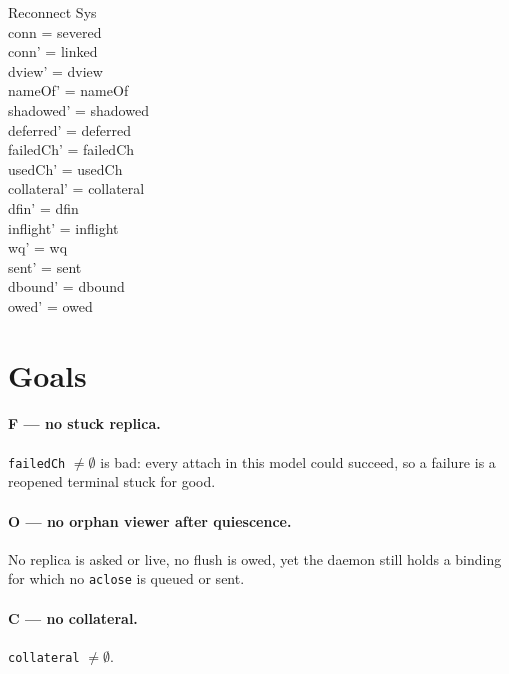 \documentclass[a4paper,10pt,fleqn]{article}
\begin{document}
\begin{schema}{Reconnect}
  \Delta Sys \\
\where
  conn = severed \\
  conn' = linked \\
  dview' = dview \\
  nameOf' = nameOf \\
  shadowed' = shadowed \\
  deferred' = deferred \\
  failedCh' = failedCh \\
  usedCh' = usedCh \\
  collateral' = collateral \\
  dfin' = dfin \\
  inflight' = inflight \\
  wq' = wq \\
  sent' = sent \\
  dbound' = dbound \\
  owed' = owed
\end{schema}


\section{Goals}

\paragraph{F --- no stuck replica.}  \texttt{failedCh} $\neq \emptyset$ is bad:
every attach in this model could succeed, so a failure is a reopened
terminal stuck for good.

\paragraph{O --- no orphan viewer after quiescence.}  No replica is asked or
live, no flush is owed, yet the daemon still holds a binding for which no
\texttt{aclose} is queued or sent.

\paragraph{C --- no collateral.}  \texttt{collateral} $\neq \emptyset$.
\end{document}
